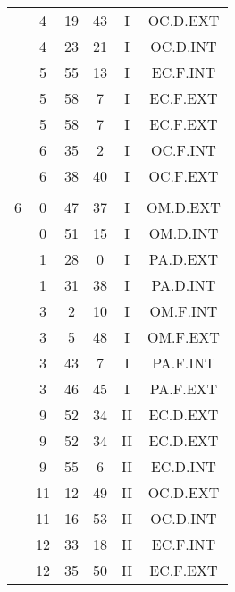 \documentclass[12pt, a4paper]{article}
\begin{document}
\begin{multicols}{3}
{\begin{tabular}{c c c c c c}
	 	 	 	 & 4 & 19 & 43 & I & OC.D.EXT\\%
	 	 	 	 & 4 & 23 & 21 & I & OC.D.INT\\%
	 	 	 	 & 5 & 55 & 13 & I & EC.F.INT\\%
	 	 	 	 & 5 & 58 & 7 & I & EC.F.EXT\\%
	 	 	 	 & 5 & 58 & 7 & I & EC.F.EXT\\%
	 	 	 	 & 6 & 35 & 2 & I & OC.F.INT\\%
	 	 	 	 & 6 & 38 & 40 & I & OC.F.EXT\\%
	 	 	 	 & & & & & \\%
	 	 	 	6 & 0 & 47 & 37 & I & OM.D.EXT\\%
	 	 	 	 & 0 & 51 & 15 & I & OM.D.INT\\%
	 	 	 	 & 1 & 28 & 0 & I & PA.D.EXT\\%
	 	 	 	 & 1 & 31 & 38 & I & PA.D.INT\\%
	 	 	 	 & 3 & 2 & 10 & I & OM.F.INT\\%
	 	 	 	 & 3 & 5 & 48 & I & OM.F.EXT\\%
	 	 	 	 & 3 & 43 & 7 & I & PA.F.INT\\%
	 	 	 	 & 3 & 46 & 45 & I & PA.F.EXT\\%
	 	 	 	 & 9 & 52 & 34 & II & EC.D.EXT\\%
	 	 	 	 & 9 & 52 & 34 & II & EC.D.EXT\\%
	 	 	 	 & 9 & 55 & 6 & II & EC.D.INT\\%
	 	 	 	 & 11 & 12 & 49 & II & OC.D.EXT\\%
	 	 	 	 & 11 & 16 & 53 & II & OC.D.INT\\%
	 	 	 	 & 12 & 33 & 18 & II & EC.F.INT\\%
	 	 	 	 & 12 & 35 & 50 & II & EC.F.EXT\\%

\end{tabular}}
\end{multicols}
\end{document}
